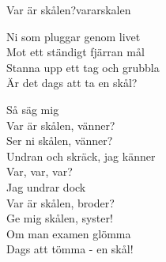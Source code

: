 \begin{song}{Var är skålen?}{vararskalen}
\begin{vers}
Ni som pluggar genom livet\\
Mot ett ständigt fjärran mål\\
Stanna upp ett tag och grubbla\\
Är det dags att ta en skål?\\
\end{vers}
\begin{vers}
Så säg mig\\
Var är skålen, vänner?\\
Ser ni skålen, vänner?\\
Undran och skräck, jag känner\\
Var, var, var?\\
Jag undrar dock\\
Var är skålen, broder?\\
Ge mig skålen, syster!\\
Om man examen glömma\\
Dags att tömma - en skål!\\
\end{vers}

\end{song}
